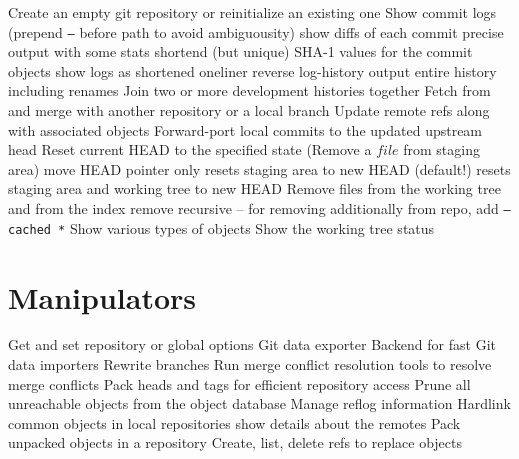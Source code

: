 	{Create an empty git repository or reinitialize an existing one}
	{Show commit logs (prepend {\tt --} before path to avoid ambiguousity)}
	{show diffs of each commit}
	{precise output with some stats}
	{shortend (but unique) SHA-1 values for the commit objects }
	{show logs as shortened oneliner}
	{reverse log-history output}
	{entire history including renames}
	{Join two or more development histories together}
	{Fetch from and merge with another re\-pository or a local branch}
	{Update remote refs along with associated objects}
	{Forward-port local commits to the updated upstream head}
	{Reset current HEAD to the specified state (Remove a $file$ from staging area)}
	{move HEAD pointer only}
	{resets staging area to new HEAD (default!)}
	{resets staging area and working tree to new HEAD}
	{Remove files from the working tree and from the index}
	{remove recursive -- for removing additionally from repo, add
{\tt --cached *}}
	{Show various types of objects}
	{Show the working tree status}

\section{Manipulators}
	{Get and set repository or global options}
	{Git data exporter}
	{Backend for fast Git data importers}
	{Rewrite branches}
	{Run merge conflict resolution tools to resolve merge conflicts}
	{Pack heads and tags for efficient repository access}
	{Prune all unreachable objects from the object database}
	{Manage reflog information}
	{Hardlink common objects in local repositories}
	{show details about the remotes}
	{Pack unpacked objects in a repository}
	{Create, list, delete refs to replace objects}

